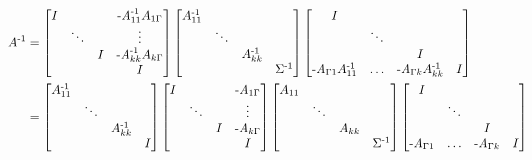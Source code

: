 \begin{figure}[h]
\tiny
\begin{align}
\label{eqn:factorization-k-subdomains-exact}
\hspace{-3cm} A^\varA{-1} &=
\begin{bmatrix}
I & & & \varB{-A}_{11}^\varA{-1}A_{1\Gamma} \\
& \ddots & & \vdots \\
& & I & \varB{-A}_{kk}^\varA{-1}A_{k\Gamma} \\
& & & I
\end{bmatrix}
\begin{bmatrix}
A_{11}^\varA{-1} & & & \\
& \ddots & & \\
& & A_{kk}^\varA{-1} & \\
& & & \Sigma^\varA{-1}
\end{bmatrix}
\begin{bmatrix}
I & & & \\
& \ddots & & \\
& & I & \\
\varB{-A}_{\Gamma 1}A_{11}^\varA{-1} & \ldots & \varB{-A}_{\Gamma k}A_{kk}^\varA{-1} & I
\end{bmatrix} \\
\label{eqn:factorization-k-subdomains-five}
&=
\begin{bmatrix}
A_{11}^\varA{-1} & & & \\
& \ddots & & \\
& & A_{kk}^\varA{-1} & \\
& & & I
\end{bmatrix}
\begin{bmatrix}
I & & & \varB{-A}_{1\Gamma} \\
& \ddots & & \vdots \\
& & I & \varB{-A}_{k\Gamma} \\
& & & I
\end{bmatrix}
\begin{bmatrix}
A_{11} & & & \\
& \ddots & & \\
& & A_{kk} & \\
& & & \Sigma^\varA{-1}
\end{bmatrix}
\begin{bmatrix}
I & & & \\
& \ddots & & \\
& & I & \\
\varB{-A}_{\Gamma 1} & \ldots & \varB{-A}_{\Gamma k} & I
\end{bmatrix}

\end{align}
\end{figure}
